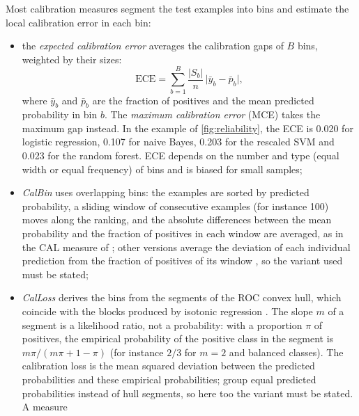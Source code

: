 Most calibration measures segment the test examples into bins and estimate the local
calibration error in each bin:
\begin{itemize}
  \item the \emph{expected calibration error} \citep{naeini2015obtaining} averages the
        calibration gaps of $B$ bins, weighted by their sizes:
        \begin{equation}
          \mathrm{ECE}=\sum_{b=1}^{B}\frac{|S_b|}{n}\,\bigl|\bar y_b-\bar p_b\bigr|,
        \end{equation}
        where $\bar y_b$ and $\bar p_b$ are the fraction of positives and the mean predicted
        probability in bin $b$. The \emph{maximum calibration error} (MCE) takes the maximum
        gap instead. In the example of \cref{fig:reliability}, the ECE is 0.020 for logistic
        regression, 0.107 for naive Bayes, 0.203 for the rescaled SVM and 0.023 for the
        random forest. ECE depends on the number and type (equal width or equal frequency) of
        bins and is biased for small samples;
  \item \emph{CalBin} uses overlapping bins: the examples are sorted by predicted probability,
        a sliding window of consecutive examples (for instance 100) moves along the ranking,
        and the absolute differences between the mean probability and the fraction of
        positives in each window are averaged, as in the CAL measure of \citet{caruana2004data};
        other versions average the deviation of each individual prediction from the fraction of
        positives of its window \citep{ferri2009experimental}, so the variant used must be stated;
  \item \emph{CalLoss} derives the bins from the segments of the ROC convex hull, which
        coincide with the blocks produced by isotonic regression
        \citep{fawcett2007pav}. The slope $m$ of a segment is a likelihood ratio, not a probability: with
        a proportion $\pi$ of positives, the empirical probability of the positive class in the
        segment is $m\pi/(m\pi+1-\pi)$ (for instance $2/3$ for $m=2$ and balanced classes). The
        calibration loss is the mean squared deviation between the predicted probabilities and
        these empirical probabilities; \citet{ferri2009experimental} group equal predicted
        probabilities instead of hull segments, so here too the variant must be stated. A measure

\end{itemize}
